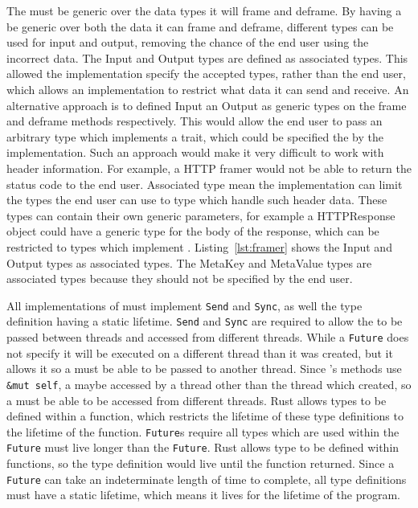 The \framer{} must be generic over the data types it will frame and deframe.
By having a \framer{} be generic over both the data it can frame and deframe, different types can be used for input
and output, removing the chance of the end user using the incorrect data.
The Input and Output types are defined as associated types.
This allowed the implementation specify the accepted types, rather than the end user, which allows an implementation to
restrict what data it can send and receive.
An alternative approach is to defined Input an Output as generic types on the frame and deframe methods respectively.
This would allow the end user to pass an arbitrary type which implements a trait, which could be specified the by
the implementation.
Such an approach would make it very difficult to work with header information.
For example, a HTTP framer would not be able to return the status code to the end user.
Associated type mean the implementation can limit the types the end user can use to type which handle such header data.
These types can contain their own generic parameters, for example a HTTPResponse object could have a generic type for
the body of the response, which can be restricted to types which implement \decode{}.
Listing~\ref{lst:framer} shows the Input and Output types as associated types.
The MetaKey and MetaValue types are associated types because they should not be specified by the end user.

All implementations of \framer{} must implement \texttt{Send} and \texttt{Sync}, as well the type definition having
a static lifetime.
\texttt{Send} and \texttt{Sync} are required to allow the \framer{} to be passed between threads and accessed from
different threads.
While a \texttt{Future} does not specify it will be executed on a different thread than it was created, but it allows
it so a \framer{} must be able to be passed to another thread.
Since \framer{}'s methods use \texttt{\&mut self}, a \framer{} maybe accessed by a thread other than the thread
which created, so a \framer{} must be able to be accessed from different threads.
Rust allows types to be defined within a function, which restricts the lifetime of these type definitions to the
lifetime of the function.
\texttt{Future}s require all types which are used within the \texttt{Future} must live longer than the \texttt{Future}.
Rust allows type to be defined within functions, so the type definition would live until the function returned.
Since a \texttt{Future} can take an indeterminate length of time to complete, all \framer{} type definitions must
have a static lifetime, which means it lives for the lifetime of the program.

